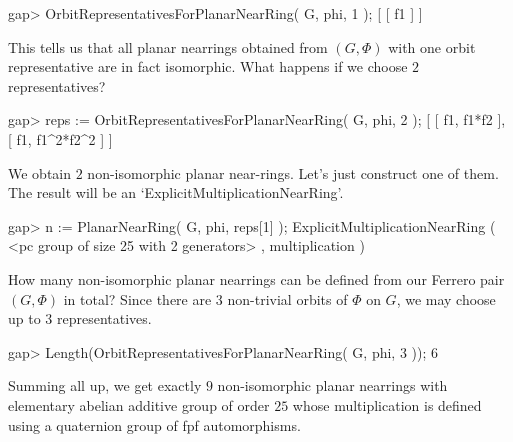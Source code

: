 \beginexample
    gap> OrbitRepresentativesForPlanarNearRing( G, phi, 1 );
    [ [ f1 ] ]
\endexample

This tells us that all planar nearrings obtained from $(G,\Phi)$ with one
orbit representative are in fact isomorphic. 
What happens if we choose $2$ representatives?

\beginexample
    gap> reps := OrbitRepresentativesForPlanarNearRing( G, phi, 2 );
    [ [ f1, f1*f2 ], [ f1, f1^2*f2^2 ] ]
\endexample

We obtain $2$ non-isomorphic planar near-rings. Let's just construct one of
them. The result will be an `ExplicitMultiplicationNearRing'.

\beginexample
    gap> n := PlanarNearRing( G, phi, reps[1] );
    ExplicitMultiplicationNearRing ( <pc group of size 25 with 
    2 generators> , multiplication )
\endexample

How many non-isomorphic planar nearrings can be defined from our Ferrero pair
$(G,\Phi)$ in total? Since there are $3$ non-trivial orbits of $\Phi$ on $G$,
we may choose up to $3$ representatives.
 
\beginexample
    gap> Length(OrbitRepresentativesForPlanarNearRing( G, phi, 3 ));
    6
\endexample

Summing all up, we get exactly $9$ non-isomorphic planar nearrings with 
elementary abelian additive group of order $25$ whose multiplication is
defined using a quaternion group of fpf automorphisms. 



